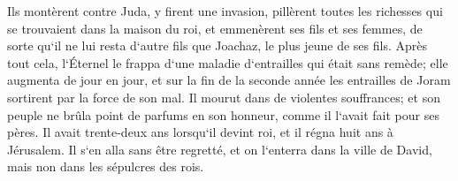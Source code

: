 \verse Ils montèrent contre Juda, y firent une invasion, pillèrent toutes les richesses qui se trouvaient dans la maison du roi, et emmenèrent ses fils et ses femmes, de sorte qu`il ne lui resta d`autre fils que Joachaz, le plus jeune de ses fils. 
\verse Après tout cela, l`Éternel le frappa d`une maladie d`entrailles qui était sans remède; 
\verse elle augmenta de jour en jour, et sur la fin de la seconde année les entrailles de Joram sortirent par la force de son mal. Il mourut dans de violentes souffrances; et son peuple ne brûla point de parfums en son honneur, comme il l`avait fait pour ses pères. 
\verse Il avait trente-deux ans lorsqu`il devint roi, et il régna huit ans à Jérusalem. Il s`en alla sans être regretté, et on l`enterra dans la ville de David, mais non dans les sépulcres des rois. 

\chapter{}

